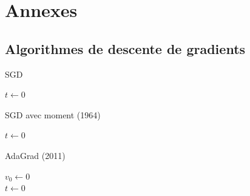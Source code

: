 \documentclass[11pt,a4paper, french]{article}
\newcommand{\vs}[1]{\vspace{#1cm}}
\theoremstyle{definition}
\begin{document}
\vs2

\nocite{kingma2017adammethodstochasticoptimization}
\nocite{starmer2023optimization}
\nocite{dereich2024convergenceratesadamoptimizer}
\nocite{github}
\renewcommand{\refname}{Sources}

\newpage

\section{Annexes}

\subsection{Algorithmes de descente de gradients}
\begin{algorithm*}
  \caption{SGD}
  $t\longleftarrow 0$ \\
\end{algorithm*}



\begin{algorithm*}
  \caption{SGD avec moment (1964)}
  $t\longleftarrow 0$ \\
  \label{SGD}
\end{algorithm*}



\begin{algorithm*}
  \caption{AdaGrad (2011)}
  $v_0\longleftarrow 0$ \\  
  $t\longleftarrow 0$ \\
  \label{adagrad}
\end{algorithm*}
\end{document}
